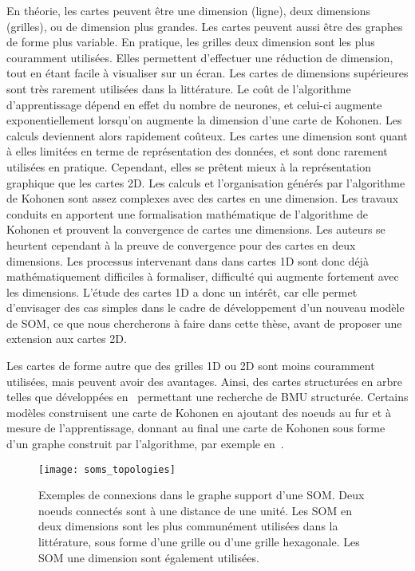 \documentclass[../main]{subfiles}
\begin{document}
En théorie, les cartes peuvent être une dimension (ligne), deux dimensions (grilles), ou de dimension plus grandes. Les cartes peuvent aussi être des graphes de forme plus variable. En pratique, les grilles deux dimension sont les plus couramment utilisées. Elles permettent d'effectuer une réduction de dimension, tout en étant facile à visualiser sur un écran. Les cartes de dimensions supérieures sont très rarement utilisées dans la littérature. Le coût de l'algorithme d'apprentissage dépend en effet du nombre de neurones, et celui-ci augmente exponentiellement lorsqu'on augmente la dimension d'une carte de Kohonen. Les calculs deviennent alors rapidement coûteux.
Les cartes une dimension sont quant à elles limitées en terme de représentation des données, et sont donc rarement utilisées en pratique. Cependant, elles se prêtent mieux à la représentation graphique que les cartes 2D.
Les calculs et l'organisation générés par l'algorithme de Kohonen sont assez complexes avec des cartes en une dimension. Les travaux conduits en \cite{cottrell_theoretical_2016,fort_soms_2006} apportent une formalisation mathématique de l'algorithme de Kohonen et prouvent la convergence de cartes une dimensions. Les auteurs se heurtent cependant à la preuve de convergence pour des cartes en deux dimensions.
Les processus intervenant dans dans cartes 1D sont donc déjà mathématiquement difficiles à formaliser, difficulté qui augmente fortement avec les dimensions.
L'étude des cartes 1D a donc un intérêt, car elle permet d'envisager des cas simples dans le cadre de développement d'un nouveau modèle de SOM, ce que nous chercherons à faire dans cette thèse, avant de proposer une extension aux cartes 2D.

Les cartes de forme autre que des grilles 1D ou 2D sont moins couramment utilisées, mais peuvent avoir des avantages. Ainsi, des cartes structurées en arbre telles que développées en~\cite{koikkalainen_self-organizing_1990} permettant une recherche de BMU structurée. Certains modèles construisent une carte de Kohonen en ajoutant des noeuds au fur et à mesure de l'apprentissage, donnant au final une carte de Kohonen sous forme d'un graphe construit par l'algorithme, par exemple en~\cite{alahakoon_dynamic_2000}.

\begin{figure}
\centering
\texttt{[image: soms\_topologies]}
\caption{Exemples de connexions dans le graphe support d'une SOM. Deux noeuds connectés sont à une distance de une unité. Les SOM en deux dimensions sont les plus communément utilisées dans la littérature, sous forme d'une grille ou d'une grille hexagonale. Les SOM une dimension sont également utilisées.}
\label{fig:topo}
\end{figure}
\end{document}
